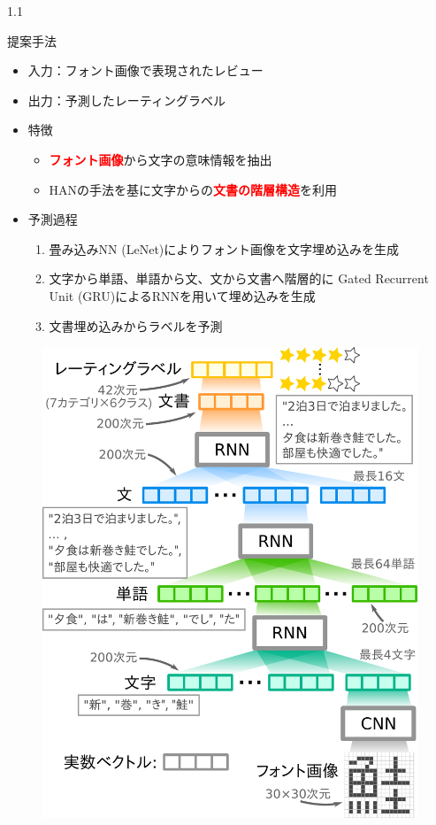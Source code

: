 \documentclass[unicode,10pt]{beamer}
\newlength{\mycolumnwidth}
\newcommand{\fire}[1]{\textcolor{red}{\textbf{#1}}}
\begin{document}
\begin{frame}[t]
\begin{columns}[onlytextwidth,t]
  \begin{column}{1.1\mycolumnwidth}
    \begin{block}{提案手法}
      \begin{itemize}
        \item 入力：フォント画像で表現されたレビュー
        \item 出力：予測したレーティングラベル
        \item 特徴
          \begin{itemize}
            \item \fire{フォント画像}から文字の意味情報を抽出
            \item HAN\cite{yang16}の手法を基に文字からの\fire{文書の階層構造}を利用
          \end{itemize}
        \item 予測過程
          \begin{enumerate}
            \item 畳み込みNN (LeNet)によりフォント画像を文字埋め込みを生成
            \item 文字から単語、単語から文、文から文書へ階層的に
                  Gated Recurrent Unit (GRU)によるRNNを用いて埋め込みを生成
            \item 文書埋め込みからラベルを予測
          \end{enumerate}
      \end{itemize}
      \vspace{-2.5ex} %
      \begin{figure}
        \includegraphics[width=0.9\linewidth]{fig/fcwsd.pdf}

\end{figure}
\end{block}
\end{column}
\end{columns}
\end{frame}
\end{document}
